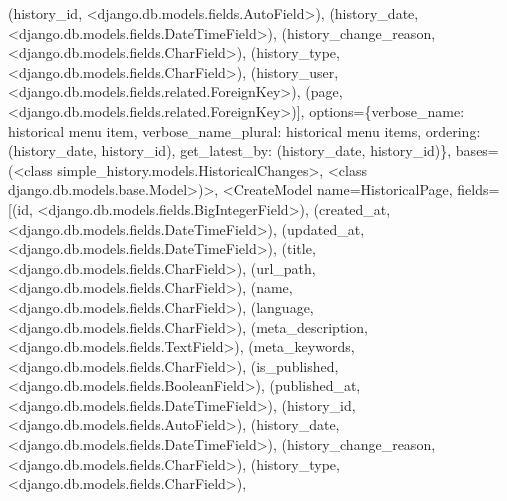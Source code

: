 \documentclass[letterpaper,10pt,english]{sphinxmanual}
\begin{document}
\begin{fulllineitems}
\begin{fulllineitems}
(\textquotesingle{}history\_id\textquotesingle{}, \textless{}django.db.models.fields.AutoField\textgreater{}), (\textquotesingle{}history\_date\textquotesingle{}, \textless{}django.db.models.fields.DateTimeField\textgreater{}), (\textquotesingle{}history\_change\_reason\textquotesingle{}, \textless{}django.db.models.fields.CharField\textgreater{}), (\textquotesingle{}history\_type\textquotesingle{}, \textless{}django.db.models.fields.CharField\textgreater{}), (\textquotesingle{}history\_user\textquotesingle{}, \textless{}django.db.models.fields.related.ForeignKey\textgreater{}), (\textquotesingle{}page\textquotesingle{}, \textless{}django.db.models.fields.related.ForeignKey\textgreater{}){]}, options=\{\textquotesingle{}verbose\_name\textquotesingle{}: \textquotesingle{}historical menu item\textquotesingle{}, \textquotesingle{}verbose\_name\_plural\textquotesingle{}: \textquotesingle{}historical menu items\textquotesingle{}, \textquotesingle{}ordering\textquotesingle{}: (\textquotesingle{}\sphinxhyphen{}history\_date\textquotesingle{}, \textquotesingle{}\sphinxhyphen{}history\_id\textquotesingle{}), \textquotesingle{}get\_latest\_by\textquotesingle{}: (\textquotesingle{}history\_date\textquotesingle{}, \textquotesingle{}history\_id\textquotesingle{})\}, bases=(\textless{}class \textquotesingle{}simple\_history.models.HistoricalChanges\textquotesingle{}\textgreater{}, \textless{}class \textquotesingle{}django.db.models.base.Model\textquotesingle{}\textgreater{})\textgreater{}, \textless{}CreateModel  name=\textquotesingle{}HistoricalPage\textquotesingle{}, fields={[}(\textquotesingle{}id\textquotesingle{}, \textless{}django.db.models.fields.BigIntegerField\textgreater{}), (\textquotesingle{}created\_at\textquotesingle{}, \textless{}django.db.models.fields.DateTimeField\textgreater{}), (\textquotesingle{}updated\_at\textquotesingle{}, \textless{}django.db.models.fields.DateTimeField\textgreater{}), (\textquotesingle{}title\textquotesingle{}, \textless{}django.db.models.fields.CharField\textgreater{}), (\textquotesingle{}url\_path\textquotesingle{}, \textless{}django.db.models.fields.CharField\textgreater{}), (\textquotesingle{}name\textquotesingle{}, \textless{}django.db.models.fields.CharField\textgreater{}), (\textquotesingle{}language\textquotesingle{}, \textless{}django.db.models.fields.CharField\textgreater{}), (\textquotesingle{}meta\_description\textquotesingle{}, \textless{}django.db.models.fields.TextField\textgreater{}), (\textquotesingle{}meta\_keywords\textquotesingle{}, \textless{}django.db.models.fields.CharField\textgreater{}), (\textquotesingle{}is\_published\textquotesingle{}, \textless{}django.db.models.fields.BooleanField\textgreater{}), (\textquotesingle{}published\_at\textquotesingle{}, \textless{}django.db.models.fields.DateTimeField\textgreater{}), (\textquotesingle{}history\_id\textquotesingle{}, \textless{}django.db.models.fields.AutoField\textgreater{}), (\textquotesingle{}history\_date\textquotesingle{}, \textless{}django.db.models.fields.DateTimeField\textgreater{}), (\textquotesingle{}history\_change\_reason\textquotesingle{}, \textless{}django.db.models.fields.CharField\textgreater{}), (\textquotesingle{}history\_type\textquotesingle{}, \textless{}django.db.models.fields.CharField\textgreater{}), 
\end{fulllineitems}
\end{fulllineitems}
\end{document}
